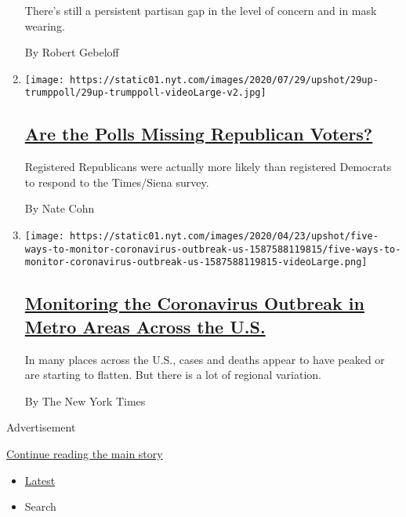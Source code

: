 \begin{enumerate}
  There's still a persistent partisan gap in the level of concern and in
  mask wearing.

  By Robert Gebeloff
\item
  \texttt{[image: https://static01.nyt.com/images/2020/07/29/upshot/29up-trumppoll/29up-trumppoll-videoLarge-v2.jpg]}

  \hypertarget{are-the-polls-missing-republican-voters}{%
  \subsection{\texorpdfstring{\href{/2020/07/29/upshot/polls-political-party-republicans.html}{Are
  the Polls Missing Republican
  Voters?}}{Are the Polls Missing Republican Voters?}}\label{are-the-polls-missing-republican-voters}}

  Registered Republicans were actually more likely than registered
  Democrats to respond to the Times/Siena survey.

  By Nate Cohn
\item
  \texttt{[image: https://static01.nyt.com/images/2020/04/23/upshot/five-ways-to-monitor-coronavirus-outbreak-us-1587588119815/five-ways-to-monitor-coronavirus-outbreak-us-1587588119815-videoLarge.png]}

  \hypertarget{monitoring-the-coronavirus-outbreak-in-metro-areas-across-the-us}{%
  \subsection{\texorpdfstring{\href{/interactive/2020/04/23/upshot/five-ways-to-monitor-coronavirus-outbreak-us.html}{Monitoring
  the Coronavirus Outbreak in Metro Areas Across the
  U.S.}}{Monitoring the Coronavirus Outbreak in Metro Areas Across the U.S.}}\label{monitoring-the-coronavirus-outbreak-in-metro-areas-across-the-us}}

  In many places across the U.S., cases and deaths appear to have peaked
  or are starting to flatten. But there is a lot of regional variation.

  By The New York Times
\end{enumerate}

Advertisement

\protect\hyperlink{after-mid1}{Continue reading the main story}

\begin{itemize}
\tightlist
\item
  \protect\hyperlink{stream-panel}{Latest}
\item
  Search
\end{itemize}

